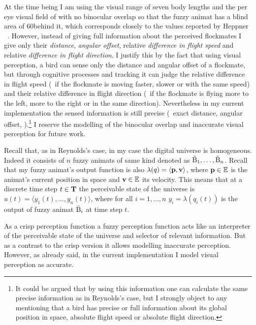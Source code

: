 At the time being I am using the visual range of seven body lengths and the per eye visual field of  with no binocular overlap so that the fuzzy animat has a blind area of 60\deg behind it, which corresponds closely to the values reported by Heppner \etal\ \cite{heppner:1985}. However, instead of giving full information about the perceived flockmates I give only their \emph{distance}, \emph{angular offset}, relative \emph{difference in flight speed} and relative \emph{difference in flight direction}. I justify this by the fact that using visual perception, a bird can sense only the distance and angular offset of a flockmate, but through cognitive processes and tracking it can judge the relative difference in flight speed (\ie\ if the flockmate is moving faster, slower or with the same speed) and their relative difference in flight direction (\ie\ if the flockmate is flying more to the left, more to the right or in the same direction). Nevertheless in my current implementation the sensed information is still precise (\ie\ exact distance, angular offset, \etc).\footnote{It could be argued that by using this information one can calculate the same precise information as in Reynolds's \cite{reynolds:1999} case, but I strongly object to any mentioning that a bird has precise or full information about its global position in space, absolute flight speed or absolute flight direction.} I reserve the modelling of the binocular overlap and inaccurate visual perception for future work.

Recall that, as in Reynolds's case, in my case the digital universe is homogeneous. Indeed it consists of $n$ fuzzy animats of same kind denoted as ${\tilde{\mathrm{B}}}_1,\ldots,{\tilde{\mathrm{B}}}_n$. Recall that my fuzzy animat's output function is also $\lambda(q)=\langle {\ensuremath{\mathbf{p}}}, {\mathbf{v}} \rangle$, where ${\mathbf{p}} \in \mathbb{E}$ is the animat's current position in space and ${\mathbf{v}} \in \mathbb{E}$ its velocity. This means that at a discrete time step $t \in {\ensuremath{\mathbf{T}}}$ the perceivable state of the universe is $u(t)=\langle y_1(t),\ldots,y_n(t) \rangle$, where for all $i=1,\ldots,n$ $y_i=\lambda(q_i(t))$ is the output of fuzzy animat ${\tilde{\mathrm{B}}}_i$ at time step $t$.

As a crisp perception function a fuzzy perception function acts like an interpreter of the perceivable state of the universe and selector of relevant information. But as a contrast to the crisp version it allows modelling inaccurate perception. However, as already said, in the current implementation I model visual perception as accurate.

